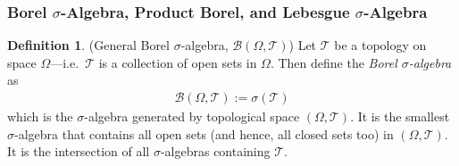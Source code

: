 \documentclass[12pt]{article}
\theoremstyle{plain}
\theoremstyle{definition}
\newtheorem{defn}[thm]{Definition}
\theoremstyle{remark}
\newcommand{\sB}{\mathscr{B}}
\newcommand{\sT}{\mathscr{T}}
\begin{document}
\subsubsection{Borel $\sigma$-Algebra, Product Borel, and Lebesgue
$\sigma$-Algebra}

\begin{defn}(General Borel $\sigma$-algebra, $\sB(\Omega,\sT)$)
\label{defn:borel-general}
Let $\sT$ be a topology on space $\Omega$---i.e.\ $\sT$ is a collection
of open sets in $\Omega$. Then define the \emph{Borel $\sigma$-algebra}
as
\begin{align*}
  \sB(\Omega,\sT):=\sigma(\sT)
\end{align*}
which is the $\sigma$-algebra generated by topological space
$(\Omega,\sT)$. It is the smallest $\sigma$-algebra that contains all
open sets (and hence, all closed sets too) in $(\Omega,\sT)$. It is the
intersection of all $\sigma$-algebras containing $\sT$.
\end{defn}
\end{document}
